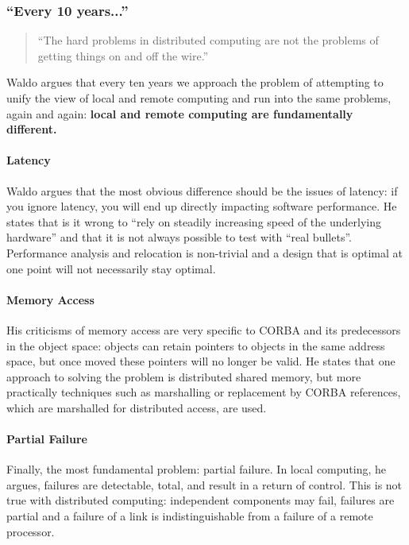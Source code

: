 \subsubsection{``Every 10 years...''}

\begin{quote}
``The hard problems in distributed computing are not the problems of getting things on and off the wire.''~\cite{kendall1994note}
\end{quote}

Waldo argues that every ten years we approach the problem of attempting to unify the view of local and remote computing and run into the same problems, again and again: \textbf{local and remote computing are fundamentally different.}

\paragraph{Latency} Waldo argues that the most obvious difference should be the issues of latency: if you ignore latency, you will end up directly impacting software performance.  He states that is it wrong to ``rely on steadily increasing speed of the underlying hardware'' and that it is not always possible to test with ``real bullets''.  Performance analysis and relocation is non-trivial and a design that is optimal at one point will not necessarily stay optimal.

\paragraph{Memory Access} His criticisms of memory access are very specific to CORBA and its predecessors in the object space: objects can retain pointers to objects in the same address space, but once moved these pointers will no longer be valid.  He states that one approach to solving the problem is distributed shared memory, but more practically techniques such as marshalling or replacement by CORBA references, which are marshalled for distributed access, are used.

\paragraph{Partial Failure} Finally, the most fundamental problem: partial failure.  In local computing, he argues, failures are detectable, total, and result in a return of control.  This is not true with distributed computing: independent components may fail, failures are partial and a failure of a link is indistinguishable from a failure of a remote processor.

